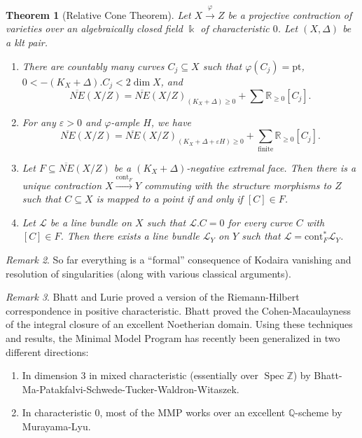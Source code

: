 \documentclass[leqno, openany]{memoir}
\newtheorem{thm}{Theorem}[section]
\theoremstyle{definition}
\theoremstyle{remark}
\newtheorem{rmk}[thm]{Remark}
\theoremstyle{plain}
\theoremstyle{definition}
\theoremstyle{remark}
\newcommand{\R}{\mathbb{R}}
\newcommand{\Z}{\mathbb{Z}}
\newcommand{\Q}{\mathbb{Q}}
\renewcommand{\k}{\Bbbk}
\newcommand{\ep}{\varepsilon}
\newcommand{\msc}[1]{\mathscr{#1}}
\newcommand{\mr}[1]{\mathrm{#1}}
\newcommand{\ol}[1]{\overline{#1}}
\DeclareMathOperator{\Spec}{Spec}
\begin{document}
\begin{thm}[Relative Cone Theorem]
    Let $X \xrightarrow{\varphi} Z$ be a projective contraction of varieties over an algebraically closed field $\k$ of characteristic $0$. Let $(X, \Delta)$ be a klt pair.
    \begin{enumerate}
        \item There are countably many curves $C_j \subseteq X$ such that $\varphi(C_j) = \mr{pt}$, $0 < -(K_X + \Delta). C_j < 2 \dim X$, and 
            \[\ol{NE}(X/Z) = { \ol{NE}(X/Z) }_{(K_X + \Delta)\geq 0} + \sum \R_{\geq 0} [C_j]. \]
        \item For any $\ep > 0$ and $\varphi$-ample $H$, we have
            \[ \ol{NE}(X/Z) = { \ol{NE}(X/Z) }_{(K_X + \Delta + \ep H) \geq 0} + \sum_{\text{finite}} \R_{\geq 0} [C_j]. \]
        \item Let $F \subseteq \ol{NE}(X/Z)$ be a $(K_X + \Delta)$-negative extremal face. Then there is a unique contraction $X \xrightarrow{\mr{cont}_F} Y$ commuting with the structure morphisms to $Z$ such that $C \subseteq X$ is mapped to a point if and only if $[C] \in F$.
        \item Let $\msc{L}$ be a line bundle on $X$ such that $\msc{L}.C = 0$ for every curve $C$ with $[C] \in F$. Then there exists a line bundle $\msc{L}_Y$ on $Y$ such that $\msc{L} = \mr{cont}_F^* \msc{L}_Y$.
    \end{enumerate}
\end{thm}

\begin{rmk}
    So far everything is a ``formal'' consequence of Kodaira vanishing and resolution of singularities (along with various classical arguments).
\end{rmk}

\begin{rmk}
    Bhatt and Lurie proved a version of the Riemann-Hilbert correspondence in positive characteristic. Bhatt proved the Cohen-Macaulayness of the integral closure of an excellent Noetherian domain. Using these techniques and results, the Minimal Model Program has recently been generalized in two different directions:
    \begin{enumerate}
        \item In dimension $3$ in mixed characteristic (essentially over $\Spec \Z$) by Bhatt-Ma-Patakfalvi-Schwede-Tucker-Waldron-Witaszek.
        \item In characteristic $0$, most of the MMP works over an excellent $\Q$-scheme by Murayama-Lyu.
    \end{enumerate}
\end{rmk}
\end{document}
